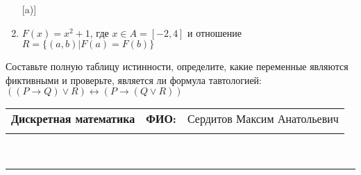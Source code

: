 \documentclass[10pt]{exam}
\newcommand{\class}{Дискретная математика}
\newcommand{\examdate}{}
\begin{document}
\begin{questions}
\begin{enumerate} [a)]
\item $F(x)=x^{2}+1$, где $x \in A = [-2, 4]$ и отношение $R = \{(a,b)|F(a) = F(b)\}$
\end{enumerate}\question Составьте полную таблицу истинности, определите, какие переменные являются фиктивными и проверьте, является ли формула тавтологией:
$((P \rightarrow Q) \lor R) \leftrightarrow (P \rightarrow (Q \lor R))$

\end{questions}
\newpage
\begin{flushright}
\begin{tabular}{p{2.8in} r l}
\textbf{\class} & \textbf{ФИО:} &Сердитов Максим Анатольевич
\\

\textbf{\examdate} &&\\
\end{tabular}\\
\end{flushright}
\rule[1ex]{\textwidth}{.1pt}
\end{document}
